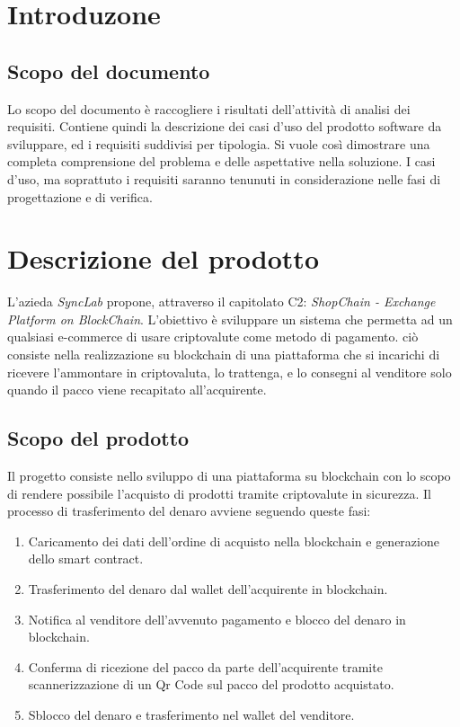 \documentclass[a4paper, 12pt]{article}
\begin{document}
\makefrontpage

\makeversioni

\section{Introduzone}
\subsection{Scopo del documento}
Lo scopo del documento è raccogliere i risultati dell'attività di analisi dei requisiti. Contiene quindi la descrizione dei casi d'uso del prodotto software da sviluppare, ed i requisiti suddivisi per tipologia. Si vuole così dimostrare una completa comprensione del problema e delle aspettative  nella soluzione. I casi d'uso, ma soprattuto i requisiti saranno tenunuti in considerazione nelle fasi di progettazione e di verifica. 

\section{Descrizione del prodotto}
L'azieda \textit{SyncLab} propone, attraverso il capitolato C2: \textit{ShopChain - Exchange Platform on
BlockChain}. L'obiettivo è sviluppare un sistema che permetta ad un qualsiasi e-commerce di usare criptovalute come metodo di pagamento. ciò consiste nella realizzazione su blockchain di una piattaforma che si incarichi di ricevere l’ammontare in criptovaluta, lo trattenga, e lo consegni al venditore solo quando il pacco viene recapitato all’acquirente.
\subsection{Scopo del prodotto}
Il progetto consiste nello sviluppo di una piattaforma su blockchain con lo scopo di rendere possibile l'acquisto di prodotti tramite criptovalute in sicurezza. Il processo di trasferimento del denaro avviene seguendo queste fasi:
\begin{enumerate}
\item Caricamento dei dati dell'ordine di acquisto nella blockchain e generazione dello smart contract.
\item Trasferimento del denaro dal wallet dell'acquirente in blockchain.
\item Notifica al venditore dell'avvenuto pagamento e blocco del denaro in blockchain.
\item Conferma di ricezione del pacco da parte dell'acquirente tramite scannerizzazione di un Qr Code sul pacco del prodotto acquistato.
\item Sblocco del denaro e trasferimento nel wallet del venditore.
\end{enumerate}
\end{document}
